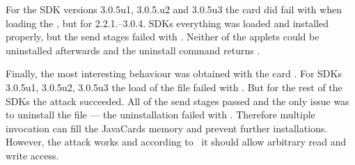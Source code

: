 \documentclass{../llncs/llncs}
\begin{document}
            For the SDK versions 3.0.5u1, 3.0.5.u2 and 3.0.5u3 the card \Acard did fail with \swwrongdata when loading the \appletscap, but for 2.2.1.--3.0.4. SDKs everything was loaded and installed properly, but the send stages failed with \swunknown. Neither of the applets could be uninstalled afterwards and the uninstall command returns \swconditionsnotsatisfied.

            Finally, the most interesting behaviour was obtained with the card \Jcard. For SDKs 3.0.5u1, 3.0.5u2, 3.0.5u3 the load of the file \appletscap failed with \jerror. But for the rest of the SDKs the attack succeeded. All of the send stages passed and the only issue was to uninstall the \appletscap file --- the uninstallation failed with \swconditionsnotsatisfied. Therefore multiple invocation can fill the JavaCards memory and prevent further installations. However, the attack works and according to~\cite{se:oracle:part1} it should allow arbitrary read and write access.





\end{document}
